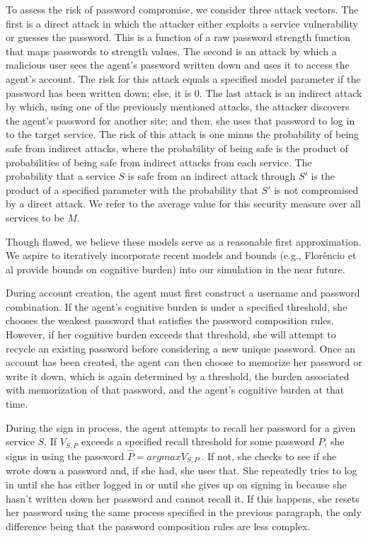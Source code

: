 \documentclass[conference]{IEEEtran}
\begin{document}
{To assess the risk of password compromise, we consider three attack 
vectors. The first is a direct attack in which the attacker either exploits a 
service vulnerability or guesses the password. This is a function of a raw 
password strength function that maps passwords to strength values. The 
second is an attack by which a malicious user sees the agent's password 
written down and uses it to access the agent's account. The risk for this 
attack equals a specified model parameter if the password has been written 
down; else, it is 0. The last attack is an indirect attack by which, using 
one of the previously mentioned attacks, the attacker discovers the 
agent's password for another site; and then, she uses that password 
to log in to the target service. The risk of this attack is one minus the 
probability of being safe from indirect attacks, where the probability 
of being safe is the product of probabilities of being safe from indirect 
attacks from each service. The probability that a service $S$ is safe 
from an indirect attack through $S'$ is the product of a specified 
parameter with the probability that $S'$ is not compromised by a direct 
attack. We refer to the average value for this security measure over all 
services to be $M$.

Though flawed, we believe these models serve as a reasonable 
first approximation. We aspire to iteratively incorporate recent models 
and bounds (e.g., Flor\^{e}ncio et al \cite{florencio2014password} provide 
bounds on cognitive burden) into our simulation in the near future.

During account creation, the agent must first construct a username and 
password combination. If the agent's cognitive burden is under a specified 
threshold, she chooses the weakest password that satisfies the password 
composition rules. However, if her cognitive burden exceeds that threshold, 
she will attempt to recycle an existing password before considering a new 
unique password. Once an account has been created, the agent can then 
choose to memorize her password or write it down, which is again 
determined by a threshold, the burden associated with memorization of that password, 
and the agent's cognitive burden at that time.

During the sign in process, the agent attempts to recall her password for a 
given service $S$. If $V_{S, P}$ exceeds a specified recall threshold for 
some password $P$, she signs in using the password 
$\displaystyle \hat{P} = argmax V_{S, P'}$. If not, she checks to see if she 
wrote down a password and, if she had, she uses that. She 
repeatedly tries to log in until she has either logged in or until she gives up 
on signing in because she hasn't written down her password and cannot 
recall it. If this happens, she resets her password using the same process 
specified in the previous paragraph, the only difference being that the 
password composition rules are less complex. 

}
\end{document}
